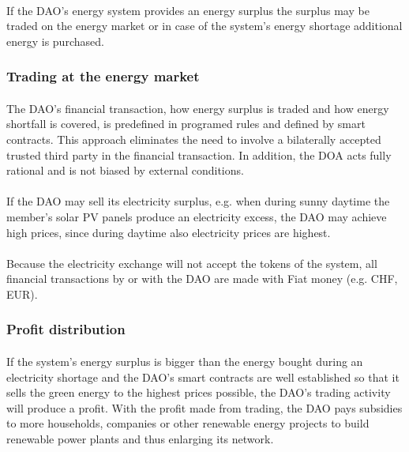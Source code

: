 \documentclass{scrartcl}
\begin{document}
	\paragraph{}
	If the DAO's energy system provides an energy surplus the surplus may be traded on the energy market or in case of the system's energy shortage additional energy is purchased.
	
	\subsubsection{Trading at the energy market}
	
	\paragraph{}
	The DAO's financial transaction, how energy surplus is traded and how energy shortfall is covered, is predefined in programed rules and defined by smart contracts. This approach eliminates the need to involve a bilaterally accepted trusted third party in the financial transaction. In addition, the DOA acts fully rational and is not biased by external conditions.
	
	\paragraph{}
	If the DAO may sell its electricity surplus, e.g. when during sunny daytime the member's solar PV panels produce an electricity excess, the DAO may achieve high prices, since during daytime also electricity prices are highest.
	
	\paragraph{}
	Because the electricity exchange will not accept the tokens of the system, all financial transactions by or with the DAO are made with Fiat money (e.g. CHF, EUR).
	
	\subsubsection{Profit distribution}
	
	\paragraph{}
	If the system's energy surplus is bigger than the energy bought during an electricity shortage and the DAO's smart contracts are well established so that it sells the green energy to the highest prices possible, the DAO's trading activity will produce a profit. With the profit made from trading, the DAO pays subsidies to more households, companies or other renewable energy projects to build renewable power plants and thus enlarging its network.
	
\end{document}
